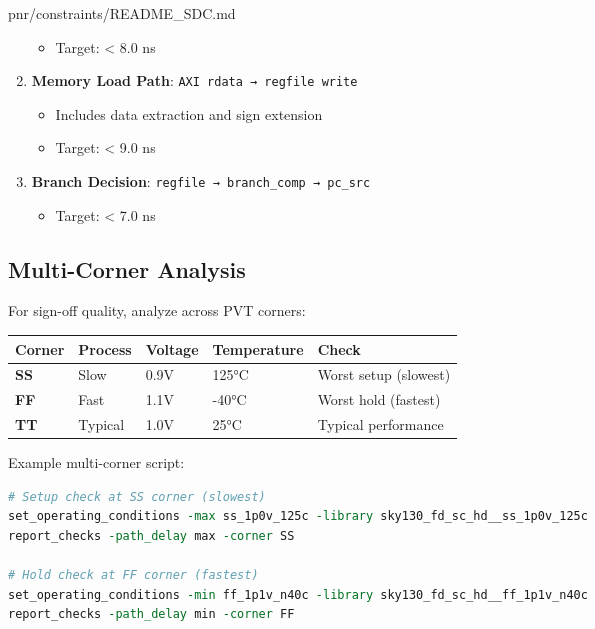 \begin{relocated}{pnr/constraints/README_SDC.md}
\begin{enumerate}
  \begin{itemize}
  \tightlist
  \item
    Target: \textless{} 8.0 ns
  \end{itemize}
\item
  \textbf{Memory Load Path}: \texttt{AXI\ rdata\ →\ regfile\ write}

  \begin{itemize}
  \tightlist
  \item
    Includes data extraction and sign extension
  \item
    Target: \textless{} 9.0 ns
  \end{itemize}
\item
  \textbf{Branch Decision}:
  \texttt{regfile\ →\ branch\_\allowbreak{}comp\ →\ pc\_\allowbreak{}src}

  \begin{itemize}
  \tightlist
  \item
    Target: \textless{} 7.0 ns
  \end{itemize}
\end{enumerate}

\subsection{Multi-Corner Analysis}\label{tm:pd:constraints-readme-sdc:multi-corner-analysis}

For sign-off quality, analyze across PVT corners:

{
\begin{longtable}[]{@{}lllll@{}}
\toprule\noalign{}
Corner & Process & Voltage & Temperature & Check \\
\midrule\noalign{}
\endhead
\bottomrule\noalign{}
\endlastfoot
\textbf{SS} & Slow & 0.9V & 125°C & Worst setup (slowest) \\
\textbf{FF} & Fast & 1.1V & -40°C & Worst hold (fastest) \\
\textbf{TT} & Typical & 1.0V & 25°C & Typical performance \\
\end{longtable}
}

Example multi-corner script:

\begin{lstlisting}[language=tcl]
# Setup check at SS corner (slowest)
set_operating_conditions -max ss_1p0v_125c -library sky130_fd_sc_hd__ss_1p0v_125c
report_checks -path_delay max -corner SS

# Hold check at FF corner (fastest)
set_operating_conditions -min ff_1p1v_n40c -library sky130_fd_sc_hd__ff_1p1v_n40c
report_checks -path_delay min -corner FF
\end{lstlisting}


\end{relocated}
